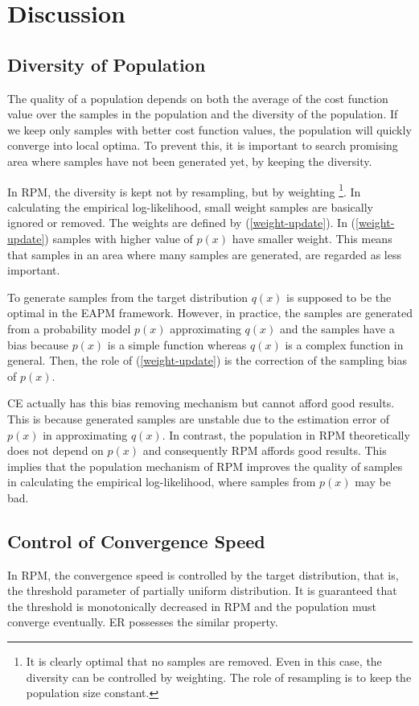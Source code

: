 \section{Discussion}
\subsection{Diversity of Population}
The quality of a population depends on both 
the average of the cost function value over the samples in the population
and
the diversity of the population.
If we keep only samples with better cost function values,
the population will quickly converge into local optima.
To prevent this, it is important to
search promising area
where samples have not been generated yet,
by keeping the diversity.

In RPM, 
the diversity is kept not by resampling, but by weighting
\footnote{ It is clearly optimal that no samples are removed.
Even in this case, the diversity can be controlled by weighting.
The role of resampling is to keep the population size constant.}.
In calculating the empirical log-likelihood,
small weight samples are basically ignored or removed.
The weights are defined by (\ref{weight-update}).
In (\ref{weight-update})
samples with higher value of $p(x)$ have smaller weight.
This means that
samples in an area where many samples are generated, 
are regarded as less important.

To generate samples from the target distribution $q(x)$ 
is supposed to be the optimal in the EAPM framework.
However, in practice, the samples are generated from 
a probability model $p(x)$ approximating $q(x)$
and the samples have a bias because
$p(x)$ is a simple function whereas $q(x)$ is a complex function in general.
Then, the role of (\ref{weight-update}) is
the correction of the sampling bias of $p(x)$.

CE actually has this bias removing mechanism 
but cannot afford good results.
This is because generated samples are unstable
due to the estimation error of $p(x)$ in approximating $q(x)$.
In contrast, the population in RPM theoretically does not
depend on $p(x)$ and consequently RPM affords good results. 
This implies that the population mechanism of RPM
improves the quality of samples in calculating the empirical
log-likelihood, where samples from $p(x)$ may be bad.


\subsection{Control of Convergence Speed}
In RPM, the convergence speed is controlled by
the target distribution, that is, 
the threshold parameter of partially uniform distribution.
It is guaranteed that
the threshold is monotonically decreased in RPM and
the population must converge eventually.
ER possesses the similar property.

